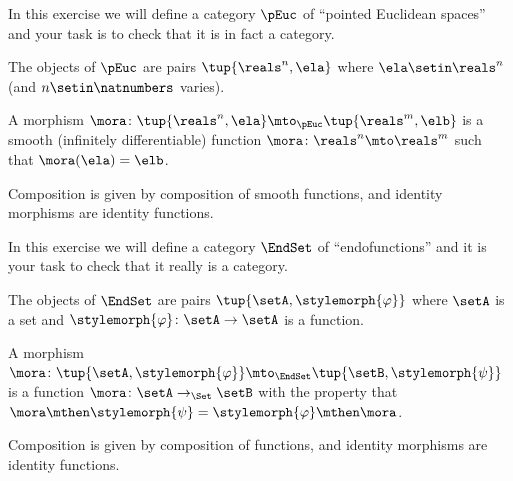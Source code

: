 
\begin{gradedexercise}
    \label{ex:pointed-euclidean-spaces}

    In this exercise we will define a category $\pEuc$ of ``pointed Euclidean spaces'' and your task is to check that it is in fact a category.

    The objects of $\pEuc$ are pairs $\tup{\reals^n, \ela}$ where $\ela \setin \reals^n$ (and $n \setin \natnumbers$ varies).

    A morphism $\mora \colon \tup{\reals^n, \ela} \mto_{\pEuc} \tup{\reals^m, \elb}$ is a smooth (infinitely differentiable) function $\mora \colon \reals^n \mto \reals^m$ such that $\mora(\ela) = \elb$.

    Composition is given by composition of smooth functions, and identity morphisms are identity functions.

\end{gradedexercise}


\begin{gradedexercise}
    \label{ex:endofunctions}

    In this exercise we will define a category $\EndSet$ of ``endofunctions'' and it is your task to check that it really is a category.

    The objects of $\EndSet$ are pairs $\tup{\setA, \stylemorph{\varphi}}$ where $\setA$ is a set and $\stylemorph{\varphi} \colon \setA \to \setA$ is a function.

    A morphism $\mora \colon \tup{\setA, \stylemorph{\varphi}} \mto_\EndSet \tup{\setB, \stylemorph{\psi}}$ is a function $\mora \colon \setA \to_\Set \setB$ with the property that $\mora \mthen \stylemorph{\psi}= \stylemorph{\varphi} \mthen \mora$.

    Composition is given by composition of functions, and identity morphisms are identity functions.

\end{gradedexercise}


